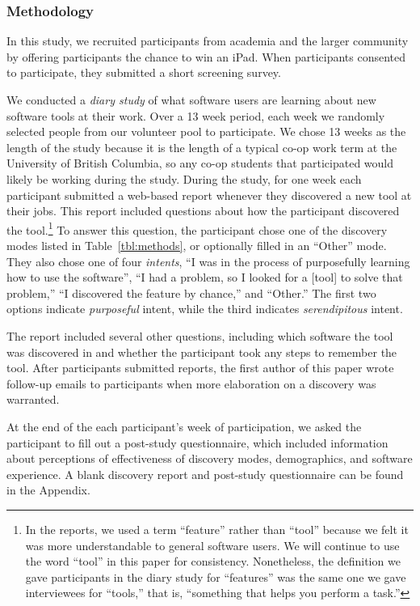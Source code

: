 \documentclass[smallextended]{svjour3}
\newcommand\context{mode\xspace}
\newcommand\contexts{modes\xspace}
\begin{document}
\subsubsection{Methodology}

\noindent
In this study, we recruited participants from academia and the larger community
by offering participants the chance to win an iPad.
When participants consented to participate, they submitted a short screening survey.

We conducted a \emph{diary study} of what software users 
are learning about new software tools at their work.
Over a 13 week period, each week we randomly selected people
from our volunteer pool to participate.
We chose 13 weeks as the length of the study because it is the 
length of a typical co-op work term at the University of British Columbia,
so any co-op students that participated would likely be working 
during the study.
During the study, for one week each participant submitted 
a web-based report whenever they discovered a new tool at their jobs.
This report included questions about how the participant discovered the 
tool.\footnote{In the reports, we used a term ``feature'' rather than ``tool''
because we felt it was more understandable to general software users.
We will continue to use the word ``tool'' in this paper for consistency.
Nonetheless, the definition we gave participants in the diary study for
``features'' was the same one we gave interviewees for ``tools,'' that is,
``something that helps you perform a task.''
}
To answer this question, the participant chose one of the discovery
\contexts listed in Table~\ref{tbl:methods}, or optionally filled in an
``Other'' \context.
They also chose one of four \emph{intents},
``I was in the process of purposefully learning how to use the software'',
``I had a problem, so I looked for a [tool] to solve that problem,''
``I discovered the feature by chance,'' and
``Other.''
The first two options indicate \emph{purposeful} intent, 
while the third indicates \emph{serendipitous} intent.
 
The report included several other questions, including which software the tool
was discovered in and whether the participant took any steps to remember the tool.
After participants submitted reports, the first author of this paper wrote follow-up
emails to participants when more elaboration on a discovery was warranted.

At the end of the each participant's week of participation, we asked the participant to 
fill out a post-study questionnaire, which included information about perceptions 
of effectiveness of discovery modes, demographics, and software experience.
A blank discovery report and post-study questionnaire can be found in the Appendix.
 
\end{document}
